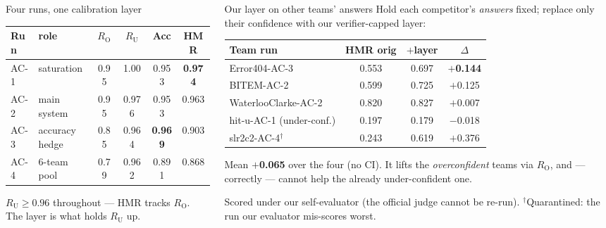 \documentclass[final]{beamer}
\newcommand{\HMR}{\textsc{HMR}}
\newcommand{\RO}{R_{\mathrm{O}}}
\newcommand{\RU}{R_{\mathrm{U}}}
\begin{document}
\begin{frame}[t]
\begin{columns}[t]
\begin{column}{.315\paperwidth}
\begin{block}{Four runs, one calibration layer}
\centering\normalsize
\begin{tabular}{llcccc}
\toprule
Run & role & $\RO$ & $\RU$ & Acc & \HMR\\
\midrule
AC-1 & saturation & 0.95 & 1.00 & 0.953 & \textbf{0.974}\\
AC-2 & main system & 0.95 & 0.976 & 0.953 & 0.963\\
AC-3 & accuracy hedge & 0.85 & 0.964 & \textbf{0.969} & 0.903\\
AC-4 & 6-team pool & 0.79 & 0.962 & 0.891 & 0.868\\
\bottomrule
\end{tabular}

\vspace{0.4cm}
{\large $\RU \ge 0.96$ throughout --- \HMR{} tracks $\RO$. The layer is what holds $\RU$ up.}
\end{block}

\end{column}

\begin{column}{.315\paperwidth}

\begin{block}{Our layer on other teams' answers}
{\large Hold each competitor's \emph{answers} fixed; replace only their confidence
with our verifier-capped layer:}
\vspace{0.4cm}
\centering\normalsize
\begin{tabular}{lccc}
\toprule
Team run & \HMR{} orig & $+$layer & $\Delta$\\
\midrule
Error404-AC-3 & 0.553 & 0.697 & \color{good}\textbf{$+$0.144}\\
BITEM-AC-2 & 0.599 & 0.725 & \color{good}$+$0.125\\
WaterlooClarke-AC-2 & 0.820 & 0.827 & $+$0.007\\
hit-u-AC-1 (under-conf.) & 0.197 & 0.179 & $-$0.018\\
\midrule
\color{gray}slr2c2-AC-4$^\dagger$ & \color{gray}0.243 & \color{gray}0.619 & \color{gray}$+$0.376\\
\bottomrule
\end{tabular}

\vspace{0.4cm}
{\large Mean \textbf{$+$0.065} over the four (no CI). It lifts the \emph{overconfident} teams via
$\RO$, and --- correctly --- cannot help the already under-confident one.\par}
\vspace{0.2cm}
{\normalsize Scored under our self-evaluator (the official judge cannot be re-run).
$^\dagger$Quarantined: the run our evaluator mis-scores worst.\par}
\end{block}


\end{column}
\end{columns}
\end{frame}
\end{document}
